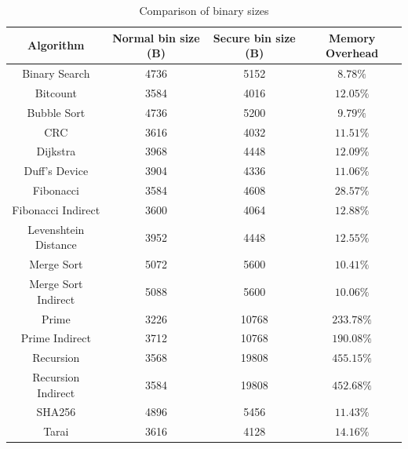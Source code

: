\begin{table}
  \centering
  \begin{tabular}{|c|c|c|c|}
    \hline
    \textbf{Algorithm}   & \textbf{Normal bin size (B)} & \textbf{Secure bin size (B)} & \textbf{Memory Overhead} \\
    \hline
    Binary Search        & 4736                         & 5152                         & $8.78\%$                 \\
    \hline
    Bitcount             & 3584                         & 4016                         & $12.05\%$                \\
    \hline
    Bubble Sort          & 4736                         & 5200                         & $9.79\%$                 \\
    \hline
    CRC                  & 3616                         & 4032                         & $11.51\%$                \\
    \hline
    Dijkstra             & 3968                         & 4448                         & $12.09\%$                \\
    \hline
    Duff's Device        & 3904                         & 4336                         & $11.06\%$                \\
    \hline
    Fibonacci            & 3584                         & 4608                         & $28.57\%$                \\
    \hline
    Fibonacci Indirect   & 3600                         & 4064                         & $12.88\%$                \\
    \hline
    Levenshtein Distance & 3952                         & 4448                         & $12.55\%$                \\
    \hline
    Merge Sort           & 5072                         & 5600                         & $10.41\%$                \\
    \hline
    Merge Sort Indirect  & 5088                         & 5600                         & $10.06\%$                \\
    \hline
    Prime                & 3226                         & 10768                        & $233.78\%$               \\
    \hline
    Prime Indirect       & 3712                         & 10768                        & $190.08\%$               \\
    \hline
    Recursion            & 3568                         & 19808                        & $455.15\%$               \\
    \hline
    Recursion Indirect   & 3584                         & 19808                        & $452.68\%$               \\
    \hline
    SHA256               & 4896                         & 5456                         & $11.43\%$                \\
    \hline
    Tarai                & 3616                         & 4128                         & $14.16\%$                \\
    \hline
  \end{tabular}
  \caption{Comparison of binary sizes}
  \label{tab:binsize}
\end{table}

